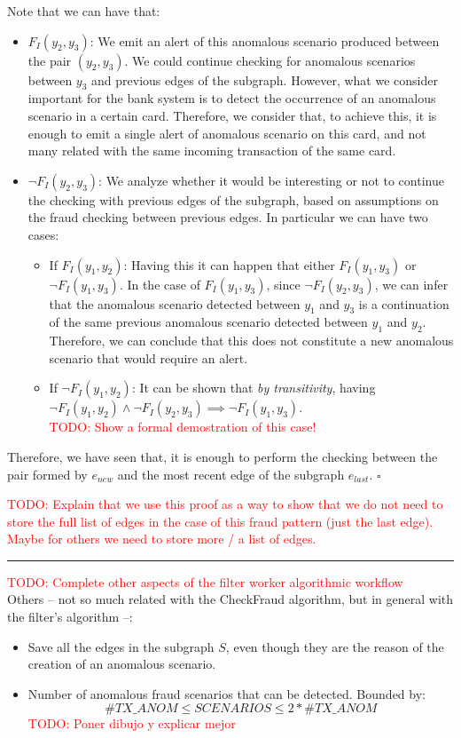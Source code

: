 Note that we can have that:
\begin{itemize}
    \item $F_I(y_2,y_3)$: We emit an alert of this anomalous scenario produced between the pair $(y_2,y_3)$. We could continue checking for anomalous scenarios between $y_3$ and previous edges of the subgraph. However, what we consider important for the bank system is to detect the occurrence of an anomalous scenario in a certain card. Therefore, we consider that, to achieve this, it is enough to emit a single alert of anomalous scenario on this card, and not many related with the same incoming transaction of the same card.
    \item $\neg F_I(y_2,y_3)$: We analyze whether it would be interesting or not to continue the checking with previous edges of the subgraph, based on assumptions on the fraud checking between previous edges. In particular we can have two cases:
    \begin{itemize}
        \item If $F_I(y_1,y_2)$: Having this it can happen that either $F_I(y_1,y_3)$ or $\neg F_I(y_1,y_3)$. In the case of $F_I(y_1,y_3)$, since $\neg F_I(y_2,y_3)$, we can infer that the anomalous scenario detected between $y_1$ and $y_3$ is a continuation of the same previous anomalous scenario detected between $y_1$ and $y_2$. Therefore, we can conclude that this does not constitute a new anomalous scenario that would require an alert.
        \item If $\neg F_I(y_1,y_2)$: It can be shown that \emph{by transitivity}, having \\
        $\neg F_I(y_1,y_2) \land \neg F_I(y_2,y_3)
        \implies \neg F_I(y_1,y_3)$. \\
        \textcolor{red}{TODO: Show a formal demostration of this case!}
    \end{itemize}
\end{itemize}

Therefore, we have seen that, it is enough to perform the checking between the pair formed by $e_{new}$ and the most recent edge of the subgraph $e_{last}$. $\square$

\textcolor{red}{TODO: Explain that we use this proof as a way to show that we do not need to store the full list of edges in the case of this fraud pattern (just the last edge). Maybe for others we need to store more / a list of edges.}


\textcolor{red}{\rule{\textwidth}{1pt}}
\textcolor{red}{TODO: Complete other aspects of the filter worker algorithmic workflow\\}
Others -- not so much related with the CheckFraud algorithm, but in general with the filter's algorithm --:
\begin{itemize}
    \item Save all the edges in the subgraph $S$, even though they are the reason of the creation of an anomalous scenario.
    \item Number of anomalous fraud scenarios that can be detected. Bounded by:
    $$\#TX\_ANOM \leq SCENARIOS \leq 2*\#TX\_ANOM$$
    \textcolor{red}{TODO: Poner dibujo y explicar mejor}
\end{itemize}

